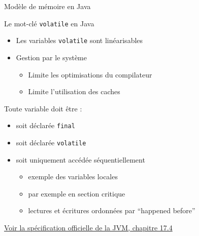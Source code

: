 
\begingroup

\begin{frame}[fragile]{Modèle de mémoire en Java}
  \begin{block}{Le mot-clé \lstinline{volatile} en Java}
    \begin{itemize}
    \item Les variables \lstinline{volatile} sont linéarisables
    \item Gestion par le système
      \begin{itemize}
      \item Limite les optimisations du compilateur
      \item Limite l'utilisation des caches
      \end{itemize}
    \end{itemize}
  \end{block}
  \vfill
  \begin{alertblock}{Toute variable doit être :}
    \begin{itemize}
    \item soit déclarée \lstinline{final}
    \item soit déclarée \lstinline{volatile}
    \item soit uniquement accédée séquentiellement
      \begin{itemize}
      \item exemple des variables locales
      \item par exemple en section critique
      \item lectures et écritures ordonnées par ``happened before''
      \end{itemize}
    \end{itemize}
  \end{alertblock}
  \vfill
  \begin{citing}
  \item \href{https://docs.oracle.com/javase/specs/jls/se7/html/jls-17.html#jls-17.4}{Voir la spécification officielle de la JVM, chapitre 17.4}
  \end{citing}
\end{frame}

\endgroup
\endinput
